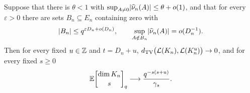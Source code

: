 \begin{theorem}\label{spn:thm:relation-criterion}
Suppose that there is $\theta<1$ with $\sup_{A\ne0}\lvert\widehat\nu_n(A)\rvert\le\theta+o(1)$, and that for
every $\varepsilon>0$ there are sets $B_n\subseteq E_n$ containing zero with
\[
 \lvert B_n\rvert\le q^{\varepsilon D_n+o(D_n)},\qquad \sup_{A\notin B_n}\lvert\widehat\nu_n(A)\rvert=o(D_n^{-1}).
\]
Then for every fixed $u\in\mathbb{Z}$ and $t=D_n+u$, $d_{\mathrm{TV}}\bigl(\mathcal L(K_n),\mathcal L(K_n^{\mathrm u})\bigr)\to0$,
and for every fixed $s\ge0$
\begin{equation}\label{spn:eq:relation-moments}
 \spnE\spnqbin{\dim K_n}{s}{q}\longrightarrow\frac{q^{-s(s+u)}}{\gamma_s}.
\end{equation}
\end{theorem}

